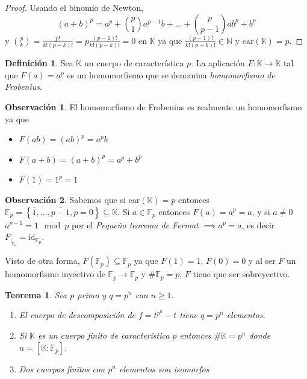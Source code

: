 \documentclass[10pt, spanish]{report}
\newtheorem{tma}{Teorema}[chapter]
\theoremstyle{definition}
\newtheorem*{defin}{Definición}
\newtheorem*{obs}{Observación}
\newcommand{\N}{\mathbb{N}}
\newcommand{\F}{\mathbb{F}}
\newcommand{\K}{\mathbb{K}}
\newcommand{\id}{\text{id}}
\newcommand{\car}[1]{\text{car}(#1)}
\renewcommand{\geq}{\geqslant}
\newcommand{\fecha}[1]{\marginpar{\underline{\footnotesize{#1}}}}
\begin{document}
\begin{proof}
    Usando el binomio de Newton,
    \[(a+b)^p=a^p+\binom{p}{1}a^{p-1}b+\ldots+\binom{p}{p-1}ab^p+b^p\] y
    $\binom{p}{k}=\frac{p!}{k!(p-k)!}=p \frac{(p-1)!}{k!(p-k)!}=0$ en $\K$ ya
    que $\frac{(p-1)!}{k!(p-k)!}\in\N$ y $\car{\K}=p$.
\end{proof}

\begin{defin}
    Sea $\K$ un cuerpo de característica $p$. La aplicación $F:\K\to\K$ tal
    que $F(a)=a^p$ es un homomorfismo que se denomina \textit{homomorfismo de
    Frobenius}.
\end{defin}

\begin{obs}
    El homomorfismo de Frobenius es realmente un homomorfismo ya que
    \begin{itemize}
        \item $F(ab)=(ab)^p=a^pb$
        \item $F(a+b)=(a+b)^p=a^p+b^p$
        \item $F(1)=1^p=1$
    \end{itemize}
\end{obs}

\fecha{15/03}
\begin{obs}
    Sabemos que si $\car{\K}=p$ entonces $\F_p=\left\{
    \overline{1},\ldots,\overline{p-1},\overline{p}=0\right\}\subseteq\K$. Si
    $a\in\F_p$ entonces $F(a)=a^p=a$, y si $a\neq0$ $a^{p-1}=1\mod p$ por el
    \textit{Pequeño teorema de Fermat} $\implies a^p=a$, es decir $F_{|_{\F_p}}=
    \id_{\F_p}$.

    Visto de otra forma, $F(\F_p)\subseteq\F_p$ ya que $F(1)=1$, $F(0)=0$ y al
    ser $F$ un homomorfismo inyectivo de $\F_p\to\F_p$ y $\#\F_p=p$, $F$ tiene
    que ser sobreyectivo.
\end{obs}

\begin{tma}
    Sea $p$ primo y $q=p^n$ con $n\geq1$.
    \begin{enumerate}
        \item El cuerpo de descomposición de $f=t^{p^n}-t$ tiene $q=p^n$
            elementos.
        \item  Si $\K$ es un cuerpo finito de característica $p$ entonces
            $\#\K=p^n$ donde $n=\left[ \K:\F_p \right]$.
        \item Dos cuerpos finitos con $p^n$ elementos son isomorfos
    \end{enumerate}
\end{tma}
\end{document}
